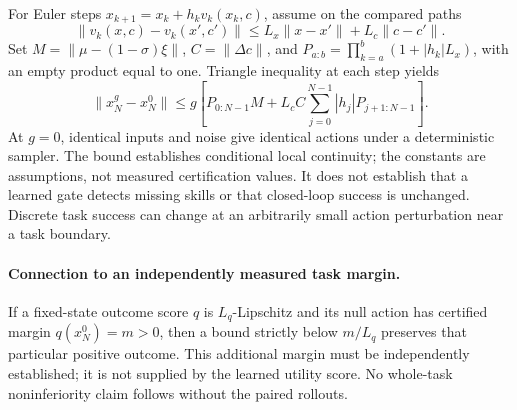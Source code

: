 For Euler steps $x_{k+1}=x_k+h_kv_k(x_k,c)$, assume on the compared paths
\[
 \|v_k(x,c)-v_k(x',c')\|
 \leq L_x\|x-x'\|+L_c\|c-c'\|.
\]
Set $M=\|\mu-(1-\sigma)\xi\|$, $C=\|\Delta c\|$, and
$P_{a:b}=\prod_{k=a}^{b}(1+|h_k|L_x)$, with an empty product equal to one.
Triangle inequality at each step yields
\[
 \|x_N^g-x_N^0\|
 \leq g\left[P_{0:N-1}M+
 L_cC\sum_{j=0}^{N-1}|h_j|P_{j+1:N-1}\right].
\]
At $g=0$, identical inputs and noise give identical actions under a
deterministic sampler. The bound establishes conditional local continuity;
the constants are assumptions, not measured certification values.
It does not establish that a learned gate detects missing skills or that
closed-loop success is unchanged. Discrete task success can change at an
arbitrarily small action perturbation near a task boundary.

\paragraph{Connection to an independently measured task margin.}
If a fixed-state outcome score $q$ is $L_q$-Lipschitz and its null action
has certified margin $q(x_N^0)=m>0$, then a bound strictly below $m/L_q$
preserves that particular positive outcome. This additional margin must be
independently established; it is not supplied by the learned utility score.
No whole-task noninferiority claim follows without the paired rollouts.
